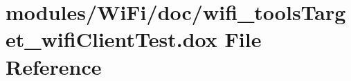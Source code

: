 \hypertarget{wifi__tools_target__wifi_client_test_8dox}{}\section{modules/\+Wi\+Fi/doc/wifi\+\_\+tools\+Target\+\_\+wifi\+Client\+Test.dox File Reference}
\label{wifi__tools_target__wifi_client_test_8dox}
